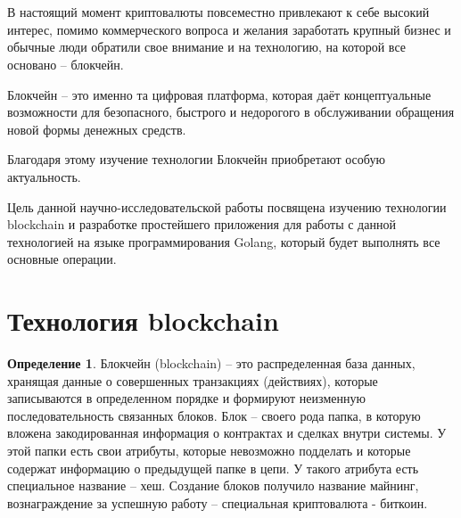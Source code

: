 \documentclass[och, master, nir]{SCWorks_fix}
\author{Sharov Alex}
\theoremstyle{plain}
\theoremstyle{plain}
\theoremstyle{plain}
\theoremstyle{definition}
\newtheorem{defn}{Определение}
\begin{document}
\setcounter{tocdepth}{2}


​
\author{Шарова Александра Вадимовича}
​
​
​
\date{2019}


\tableofcontents

\intro


В настоящий момент криптовалюты повсеместно привлекают к себе высокий интерес, помимо коммерческого вопроса и желания заработать крупный бизнес и обычные люди обратили свое внимание и на технологию, на которой все основано – блокчейн.

Блокчейн – это именно та цифровая платформа, которая даёт концептуальные возможности для безопасного, быстрого и недорогого в обслуживании обращения новой формы денежных средств.\cite{bib:block:1}

Благодаря этому изучение технологии Блокчейн приобретают особую актуальность.

Цель данной научно-исследовательской работы посвящена изучению технологии blockchain и разработке простейшего приложения для работы с данной технологией на языке программирования Golang, который будет выполнять все основные операции.

\section{Технология blockchain}

\begin{defn}
Блокчейн (blockchain) – это распределенная база данных, хранящая данные о совершенных транзакциях (действиях), которые записываются в определенном порядке и формируют неизменную последовательность связанных блоков. Блок – своего рода папка, в которую вложена закодированная информация о контрактах и сделках внутри системы. У этой папки есть свои атрибуты, которые невозможно подделать и которые содержат информацию о предыдущей папке в цепи. У такого атрибута есть специальное название – хеш. Создание блоков получило название майнинг, вознаграждение за успешную работу – специальная криптовалюта - биткоин. \cite{bib:block:4}
\end{defn}
\end{document}
